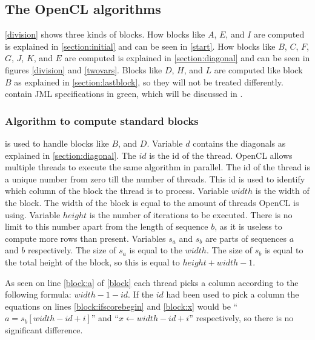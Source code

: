 \subsection{The OpenCL algorithms} \label{algorithms}
\cref{division} shows three kinds of blocks.
How blocks like $A$, $E$, and $I$ are computed is explained in \cref{section:initial} and can be seen in \cref{start}.
How blocks like $B$, $C$, $F$, $G$, $J$, $K$, and $E$ are computed is explained in \cref{section:diagonal} and can be seen in figures \ref{division} and \ref{twovars}.
Blocks like $D$, $H$, and $L$ are computed like block $B$ as explained in \cref{section:lastblock}, so they will not be treated differently.
 contain JML specifications in green, which will be discussed in .

\subsubsection{Algorithm to compute standard blocks}
 is used to handle blocks like $B$, and $D$.
Variable $d$ contains the diagonals as explained in \cref{section:diagonal}.
The $id$ is the id of the thread.
OpenCL allows multiple threads to execute the same algorithm in parallel.
The id of the thread is a unique number from zero till the number of threads.
This id is used to identify which column of the block the thread is to process.
Variable $width$ is the width of the block.
The width of the block is equal to the amount of threads OpenCL is using.
Variable $height$ is the number of iterations to be executed.
There is no limit to this number apart from the length of sequence $b$, as it is useless to compute more rows than present.
Variables $s_a$ and $s_b$ are parts of sequences $a$ and $b$ respectively.
The size of $s_a$ is equal to the $width$.
The size of $s_b$ is equal to the total height of the block, so this is equal to $height + width - 1$.

As seen on line \ref{block:a} of \cref{block} each thread picks a column according to the following formula: $width - 1 - id$.
If the $id$ had been used to pick a column the equations on lines \ref{block:ifscorebegin} and \ref{block:x} would be ``$a = s_b[width - id + i]$'' and ``$x \gets width - id + i$'' respectively, so there is no significant difference.

